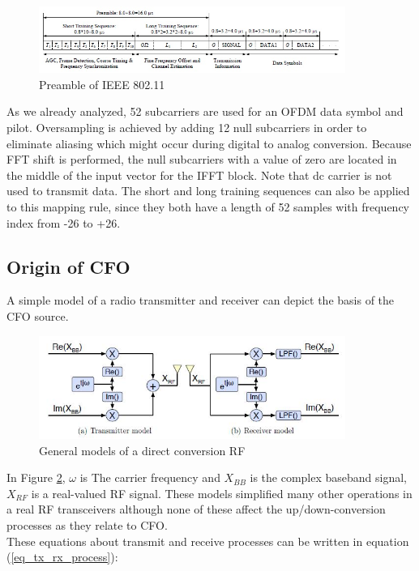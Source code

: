 \begin{figure}[h!]
\centering
\includegraphics[width=10cm]{content/fig/ofdm_frame.JPG}
\caption{Preamble of IEEE 802.11}
\label{fig:preamble_ieee}
\end{figure}


As we already analyzed, 52 subcarriers are used for an OFDM data symbol and pilot. Oversampling is achieved by adding 12 null subcarriers in order to eliminate aliasing which might occur during digital to analog conversion. Because FFT shift is performed, the null subcarriers with a value of zero are located in the middle of the input vector for the IFFT block. Note that dc carrier is not used to transmit data. The short and long training sequences can also be applied to this mapping rule, since they both have a length of 52 samples with frequency index from -26 to +26.\\


\subsection{Origin of CFO}
A simple model of a radio transmitter and receiver can depict the basis of the CFO source.

\begin{figure}[h!]
\centering
\includegraphics[width=10cm]{content/fig/cfo_radio_model.JPG}
\caption{General models of a direct conversion RF}
\label{fig:cfo_radio_model}
\end{figure}

In Figure \ref{fig:cfo_radio_model}, $\omega$ is The carrier frequency and $X_{BB}$ is the complex baseband signal, $X_{RF}$ is
a real-valued RF signal. These models simplified many other operations in a real RF transceivers although none of these affect the up/down-conversion processes as they relate to CFO.\\
These equations about transmit and receive processes can be written in equation (\ref{eq_tx_rx_process}):

